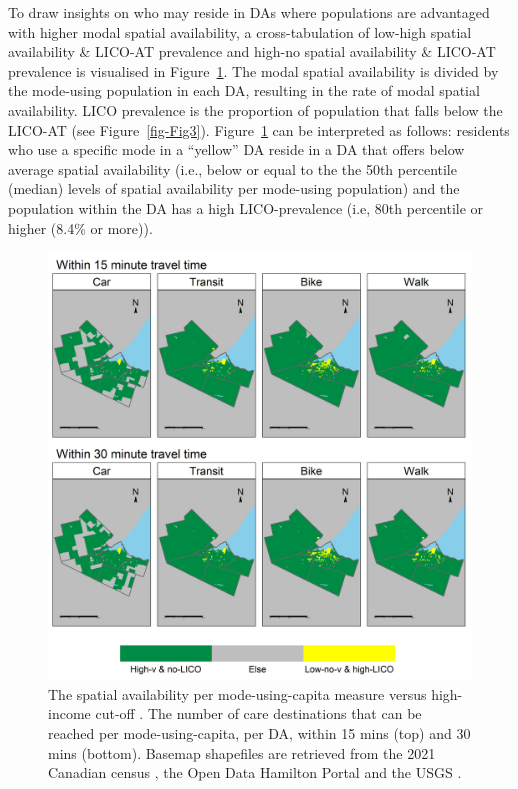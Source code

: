 \documentclass[
  authoryear,
  preprint,
  3p]{elsarticle}
\begin{document}
To draw insights on who may reside in DAs where populations are
advantaged with higher modal spatial availability, a cross-tabulation of
low-high spatial availability \& LICO-AT prevalence and high-no spatial
availability \& LICO-AT prevalence is visualised in
Figure~\ref{fig-Fig8}. The modal spatial availability is divided by the
mode-using population in each DA, resulting in the rate of modal spatial
availability. LICO prevalence is the proportion of population that falls
below the LICO-AT (see Figure~\ref{fig-Fig3}). Figure~\ref{fig-Fig8} can
be interpreted as follows: residents who use a specific mode in a
``yellow'' DA reside in a DA that offers below average spatial
availability (i.e., below or equal to the the 50th percentile (median)
levels of spatial availability per mode-using population) and the
population within the DA has a high LICO-prevalence (i.e, 80th
percentile or higher (8.4\% or more)).

\begin{figure}

{\centering \includegraphics[width=6.25in,height=\textheight]{figures/Fig8-plot_Savail_smallv_LICO_measures.png}

}

\caption{\label{fig-Fig8}The spatial availability per mode-using-capita
measure versus high-income cut-off . The number of care destinations
that can be reached per mode-using-capita, per DA, within 15 mins (top)
and 30 mins (bottom). Basemap shapefiles are retrieved from the 2021
Canadian census \citep{governmentofcanadaCensusPopulation2023}, the Open
Data Hamilton Portal \citep{opendatahamiltonCityBoundary2023} and the
USGS \citep{greatlakesUSGS2010}.}

\end{figure}
\end{document}
